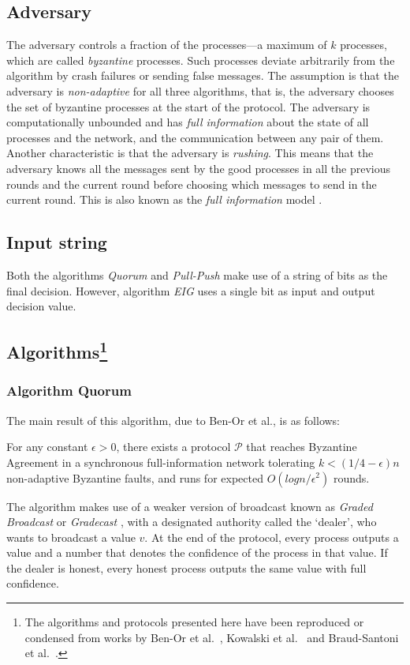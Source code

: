 \subsection{Adversary}
The adversary controls a fraction of the processes---a maximum of $k$ processes, which are called \textit{byzantine} processes. Such processes deviate arbitrarily from the algorithm by crash failures or sending false messages. The assumption is that the adversary is \textit{non-adaptive} for all three algorithms, that is, the adversary chooses the set of byzantine processes at the start of the protocol. The adversary is computationally unbounded and has \textit{full information} about the state of all processes and the network, and the communication between any pair of them. Another characteristic is that the adversary is \textit{rushing}. This means that the adversary knows all the messages sent by the good processes in all the previous rounds and the current round before choosing which messages to send in the current round. This is also known as the \textit{full information} model \cite{GGL98}.

\subsection{Input string}
Both the algorithms \textit{Quorum} and \textit{Pull-Push}  make use of a string of bits as the final decision. However, algorithm \textit{EIG} uses a single bit as input and output decision value.


\subsection{Algorithms\protect\footnote{The algorithms and protocols presented here have been reproduced or condensed from works by Ben-Or et al.~\cite{BPV06}, Kowalski et al.~\cite{KM13} and Braud-Santoni et al.~\cite{BGH13}.}}

\subsubsection{Algorithm Quorum\cite{BPV06}}
The main result of this algorithm, due to Ben-Or et al., is as follows:
\begin{theorem}
For any constant $\epsilon > 0$, there exists a protocol $\mathcal{P}$ that reaches Byzantine Agreement in a synchronous full-information network tolerating $k < (1/4 - \epsilon) n$ non-adaptive Byzantine faults, and runs for expected $O(logn/\epsilon^2)$ rounds. 
\end{theorem}
The algorithm makes use of a weaker version of broadcast known as \textit{Graded Broadcast} or \textit{Gradecast} \cite{FM97}, with a designated authority called the `dealer', who wants to broadcast a value $v$. At the end of the protocol, every process outputs a value and a number that denotes the confidence of the process in that value. If the dealer is honest, every honest process outputs the same value with full confidence. 

